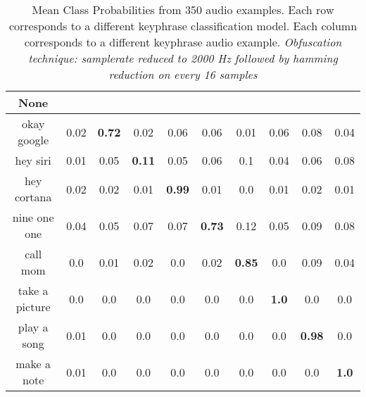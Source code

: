 \begin{table}[!th]
\begin{tabular}{cccccccccc}%
\hline%
None&\rotate{random talk}{70}&\rotate{okay google}{70}&\rotate{hey siri}{70}&\rotate{hey cortana}{70}&\rotate{nine one one}{70}&\rotate{call mom}{70}&\rotate{take a picture}{70}&\rotate{play a song}{70}&\rotate{make a note}{70}\\%
\hline%
okay google&0.02&\textbf{0.72}&0.02&0.06&0.06&0.01&0.06&0.08&0.04\\%
hey siri&0.01&0.05&\textbf{0.11}&0.05&0.06&0.1&0.04&0.06&0.08\\%
hey cortana&0.02&0.02&0.01&\textbf{0.99}&0.01&0.0&0.01&0.02&0.01\\%
nine one one&0.04&0.05&0.07&0.07&\textbf{0.73}&0.12&0.05&0.09&0.08\\%
call mom&0.0&0.01&0.02&0.0&0.02&\textbf{0.85}&0.0&0.09&0.04\\%
take a picture&0.0&0.0&0.0&0.0&0.0&0.0&\textbf{1.0}&0.0&0.0\\%
play a song&0.01&0.0&0.0&0.0&0.0&0.0&0.0&\textbf{0.98}&0.0\\%
make a note&0.01&0.0&0.0&0.0&0.0&0.0&0.0&0.0&\textbf{1.0}\\%
\hline%
\end{tabular}
\caption{Mean Class Probabilities from 350 audio examples. Each row corresponds to a different keyphrase classification model. Each column corresponds to a different keyphrase audio example. \emph{Obfuscation technique: samplerate reduced to 2000 Hz followed by hamming reduction on every 16 samples}}
\label{tab:probs_samplerate_2000_hamming_16}
\end{table}





